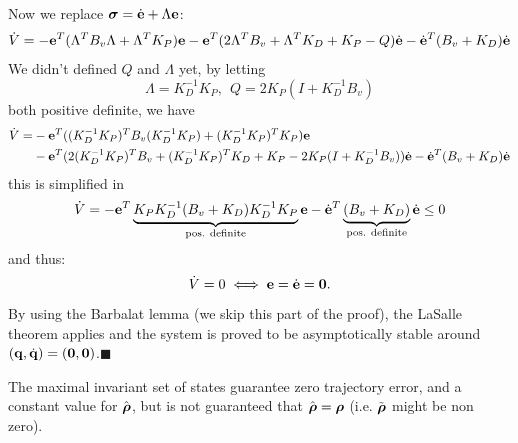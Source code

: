 \documentclass[10pt, a4paper]{report}
\newcommand{\q}{{\mathbf q}}
\begin{document}
Now we replace ${\boldsymbol{\sigma}}={\dot{\mathbf e}}+\Lambda\mathbf e$:\begin{equation}
    \dot V=-\mathbf e^T(\Lambda^TB_v\Lambda+\Lambda^TK_P)\mathbf e -
    \mathbf e^T(2\Lambda^TB_v+\Lambda^TK_D+K_P-Q){\dot{\mathbf e}}-{\dot{\mathbf e}}^T(B_v+K_D){\dot{\mathbf e}}
\end{equation}
We didn't defined  $Q$ and $\Lambda$ yet, by letting\begin{equation}
    \Lambda=K_D^{-1}K_P, \ \ Q=2K_P(I+K_D^{-1}B_v)
\end{equation}
both positive definite, we have\begin{align}
    \dot V=&-\mathbf e^T((K_D^{-1}K_P)^TB_v(K_D^{-1}K_P)+(K_D^{-1}K_P)^TK_P)\mathbf e \\
    &-\mathbf e^T(2(K_D^{-1}K_P)^TB_v+(K_D^{-1}K_P)^TK_D+K_P-2K_P(I+K_D^{-1}B_v)){\dot{\mathbf e}}-{\dot{\mathbf e}}^T(B_v+K_D){\dot{\mathbf e}}
\end{align}
this is simplified in\begin{equation}
    \dot V=-\mathbf e^T \underbrace{K_PK_D^{-1}(B_v+K_D)K_D^{-1}K_P}_{\text{pos. definite}}\mathbf e - 
    {\dot{\mathbf e}}^T\underbrace{(B_v+K_D)}_{\text{pos. definite}}{\dot{\mathbf e}}\le 0
\end{equation}
and thus:\begin{equation}
    \dot V=0\iff \mathbf e = {\dot{\mathbf e}} = \mathbf 0. 
\end{equation}
By using the Barbalat lemma (we skip this part of the proof), the LaSalle theorem applies and the system is proved to be asymptotically stable around $(\q,\dq)=(\mathbf 0,\mathbf 0)$.\hfill$\blacksquare$\bigskip

\noindent The maximal invariant set of states guarantee zero trajectory error, and a constant value for $\hat{{\boldsymbol{\rho}}}$, but is not guaranteed that $\hat {{\boldsymbol{\rho}}} = {\boldsymbol{\rho}}$ (i.e. $\tilde{{\boldsymbol{\rho}}}$ might be non zero).\bigskip
\end{document}
